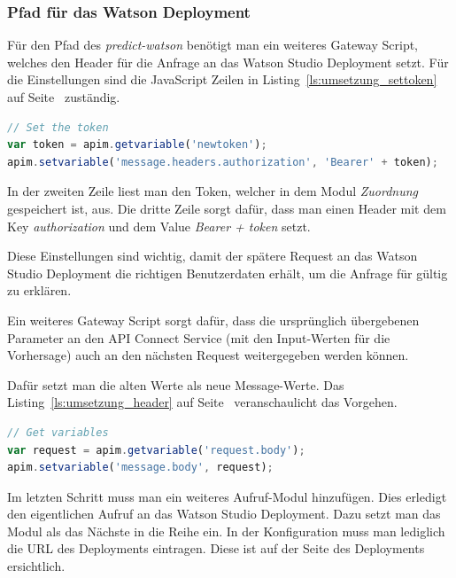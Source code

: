 \subsubsection*{Pfad für das Watson Deployment}
Für den Pfad des \textit{predict-watson} benötigt man ein weiteres Gateway Script, welches den Header für die Anfrage
an das Watson Studio Deployment setzt. Für die Einstellungen sind die JavaScript Zeilen in
Listing~\ref{ls:umsetzung_settoken} auf Seite~\pageref{ls:umsetzung_settoken} zuständig.

\begin{lstlisting}[language=JavaScript, caption=Gateway Script für den Authorization-Token, label=ls:umsetzung_settoken]
// Set the token
var token = apim.getvariable('newtoken');
apim.setvariable('message.headers.authorization', 'Bearer' + token);
\end{lstlisting}

In der zweiten Zeile liest man den Token, welcher in dem Modul \textit{Zuordnung} gespeichert ist, aus. Die dritte
Zeile sorgt dafür, dass man einen Header mit dem Key \textit{authorization} und dem Value \textit{Bearer + token} setzt.

Diese Einstellungen sind wichtig, damit der spätere Request an das Watson Studio Deployment die richtigen Benutzerdaten
erhält, um die Anfrage für gültig zu erklären.

Ein weiteres Gateway Script sorgt dafür, dass die ursprünglich übergebenen Parameter an den API Connect Service (mit den
Input-Werten für die Vorhersage) auch an den nächsten Request weitergegeben werden können.

Dafür setzt man die alten Werte als neue Message-Werte. Das Listing~\ref{ls:umsetzung_header} auf
Seite~\pageref{ls:umsetzung_header} veranschaulicht das Vorgehen.

\begin{lstlisting}[language=JavaScript, caption=Gateway Script zum Setzen des Message-Bodies, label=ls:umsetzung_header]
// Get variables
var request = apim.getvariable('request.body');
apim.setvariable('message.body', request);
\end{lstlisting}

Im letzten Schritt muss man ein weiteres Aufruf-Modul hinzufügen. Dies erledigt den eigentlichen Aufruf an das Watson
Studio Deployment. Dazu setzt man das Modul als das Nächste in die Reihe ein. In der Konfiguration muss man lediglich
die URL des Deployments eintragen. Diese ist auf der Seite des Deployments ersichtlich.

